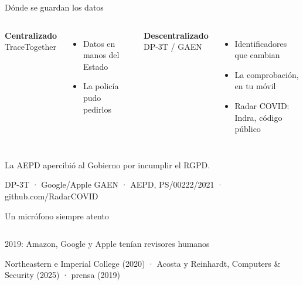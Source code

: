 \documentclass[aspectratio=169,12pt]{beamer}
\newcommand{\fuente}[1]{\vfill{\small\color{gris}#1\par}}
\begin{document}
\begin{frame}{Dónde se guardan los datos}
  \begin{columns}[T]
      \begin{center}{\large\bfseries\color{terra}Centralizado}\\[-0.1cm]{\normalsize TraceTogether}\end{center}
      \begin{itemize}
        \item Datos en manos del Estado
        \item La policía pudo pedirlos
      \end{itemize}
      \begin{center}{\large\bfseries\color{azul}Descentralizado}\\[-0.1cm]{\normalsize DP-3T / GAEN}\end{center}
      \begin{itemize}
        \item Identificadores que cambian
        \item La comprobación, en tu móvil
        \item Radar COVID: Indra, código público
      \end{itemize}
  \end{columns}
  {\normalsize\alert{La AEPD apercibió al Gobierno por incumplir el RGPD.}}
  \fuente{DP-3T · Google/Apple GAEN · AEPD, PS/00222/2021 · github.com/RadarCOVID}
\end{frame}

\begin{frame}{Un micrófono siempre atento}
  \begin{columns}[T]
  \end{columns}
  \vspace{0.2cm}
  \begin{center}
    {\large 2019: Amazon, Google y Apple tenían \alert{revisores humanos}}
  \end{center}
  \fuente{Northeastern e Imperial College (2020) · Acosta y Reinhardt, Computers \& Security (2025) · prensa (2019)}
\end{frame}
\end{document}

